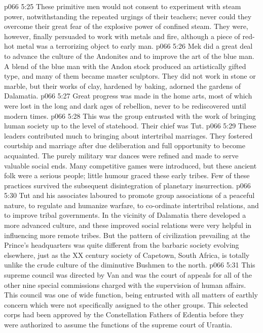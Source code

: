 \vs p066 5:25 These primitive men would not consent to experiment with steam power, notwithstanding the repeated urgings of their teachers; never could they overcome their great fear of the explosive power of confined steam. They were, however, finally persuaded to work with metals and fire, although a piece of red\hyp{}hot metal was a terrorizing object to early man.
\vs p066 5:26 Mek did a great deal to advance the culture of the Andonites and to improve the art of the blue man. A blend of the blue man with the Andon stock produced an artistically gifted type, and many of them became master sculptors. They did not work in stone or marble, but their works of clay, hardened by baking, adorned the gardens of Dalamatia.
\vs p066 5:27 Great progress was made in the home arts, most of which were lost in the long and dark ages of rebellion, never to be rediscovered until modern times.
\vs p066 5:28 \bibnobreakspace {} This was the group entrusted with the work of bringing human society up to the level of statehood. Their chief was Tut.
\vs p066 5:29 These leaders contributed much to bringing about intertribal marriages. They fostered courtship and marriage after due deliberation and full opportunity to become acquainted. The purely military war dances were refined and made to serve valuable social ends. Many competitive games were introduced, but these ancient folk were a serious people; little humour graced these early tribes. Few of these practices survived the subsequent disintegration of planetary insurrection.
\vs p066 5:30 Tut and his associates laboured to promote group associations of a peaceful nature, to regulate and humanize warfare, to co\hyp{}ordinate intertribal relations, and to improve tribal governments. In the vicinity of Dalamatia there developed a more advanced culture, and these improved social relations were very helpful in influencing more remote tribes. But the pattern of civilization prevailing at the Prince’s headquarters was quite different from the barbaric society evolving elsewhere, just as the XX century society of Capetown, South Africa, is totally unlike the crude culture of the diminutive Bushmen to the north.
\vs p066 5:31 \bibnobreakspace {} This supreme council was directed by Van and was the court of appeals for all of the other nine special commissions charged with the supervision of human affairs. This council was one of wide function, being entrusted with all matters of earthly concern which were not specifically assigned to the other groups. This selected corps had been approved by the Constellation Fathers of Edentia before they were authorized to assume the functions of the supreme court of Urantia.
